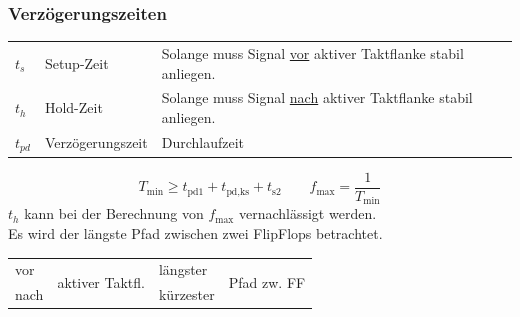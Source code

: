 \subsubsection{Verzögerungszeiten}
\begin{flushleft}
    \small
    \begin{tabular}{l l p{32mm}}
        $t_s$ & Setup-Zeit & Solange muss Signal \underline{vor} aktiver Taktflanke stabil anliegen.\\
        $t_h$ & Hold-Zeit & Solange muss Signal \underline{nach} aktiver Taktflanke stabil anliegen.\\
        $t_{pd}$ & Verzögerungszeit & Durchlaufzeit
    \end{tabular}
\end{flushleft}
\begin{equation*}
    T_{\text{min}} \geq t_{\text{pd}1} + t_{\text{pd,ks}} + t_{\text{s}2} \qquad f_{\text{max}} = \frac{1}{T_{\text{min}}}
\end{equation*}
$t_h$ kann bei der Berechnung von $f_{\text{max}}$ vernachlässigt werden.\\
Es wird der längste Pfad zwischen zwei FlipFlops betrachtet.\\
\begin{tabular}{l l l l}
    vor & \multirow{2}{*}{aktiver Taktfl.} & längster & \multirow{2}{*}{Pfad zw. FF}\\
    \cline{1-1} \cline{3-3}
    nach & & kürzester & 
\end{tabular}

